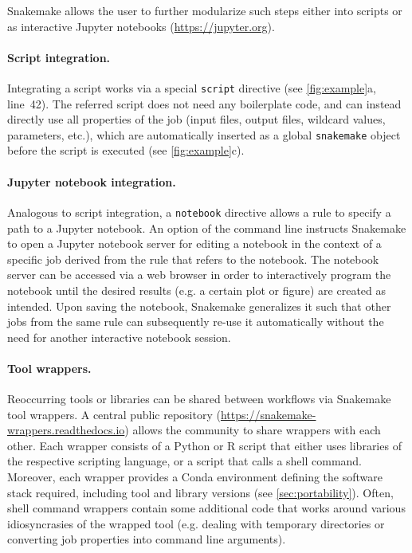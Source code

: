 \documentclass[parskip=half]{scrartcl}
\let\plainurl\url
\renewcommand{\url}[1]{\protect\plainurl{#1}}
\begin{document}
Snakemake allows the user to further modularize such steps either into scripts or as interactive Jupyter notebooks (\url{https://jupyter.org}).

\paragraph{Script integration.}
Integrating a script works via a special \lstinline!script! directive (see \autoref{fig:example}a, line~42).
The referred script does not need any boilerplate code, and can instead directly use all properties of the job (input files, output files, wildcard values, parameters, etc.), which are automatically inserted as a global \lstinline!snakemake! object before the script is executed (see \autoref{fig:example}c).

\paragraph{Jupyter notebook integration.}
Analogous to script integration, a \lstinline!notebook! directive allows a rule to specify a path to a Jupyter notebook. An option of the command line instructs Snakemake to open a Jupyter notebook server for editing a notebook in the context of a specific job derived from the rule that refers to the notebook.
The notebook server can be accessed via a web browser in order to interactively program the notebook until the desired results (e.g. a certain plot or figure) are created as intended.
Upon saving the notebook, Snakemake generalizes it such that other jobs from the same rule can subsequently re-use it automatically without the need for another interactive notebook session.

\paragraph{Tool wrappers.}
Reoccurring tools or libraries can be shared between workflows via Snakemake tool wrappers.
A central public repository (\url{https://snakemake-wrappers.readthedocs.io}) allows the community to share wrappers with each other.
Each wrapper consists of a Python or R script that either uses libraries of the respective scripting language, or a script that calls a shell command.
Moreover, each wrapper provides a Conda environment defining the software stack required, including tool and library versions (see \autoref{sec:portability}).
Often, shell command wrappers contain some additional code that works around various idiosyncrasies of the wrapped tool (e.g. dealing with temporary directories or converting job properties into command line arguments).
\end{document}
